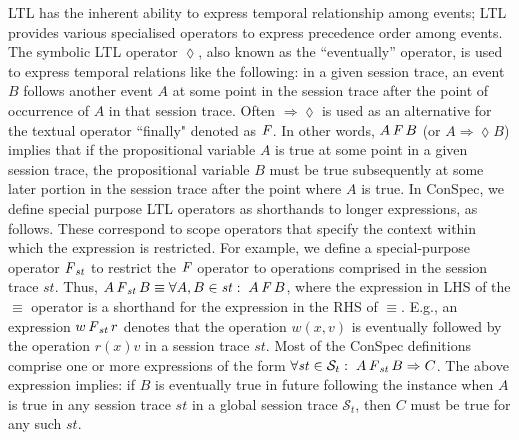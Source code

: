 \documentclass[journal,compsoc]{IEEEtran}
\begin{document}
 LTL has the inherent ability to express temporal relationship among events; LTL provides various specialised operators to express precedence order among events. The symbolic LTL operator  $\lozenge$, also known as the ``eventually''  operator, is used to express temporal relations like the following: in a given session trace, an event $B$ follows another event $A$ at some point in the session trace after the point of occurrence of $A$ in that session trace. Often  $\Rightarrow \lozenge$ is used as an alternative for the textual  operator ``finally" denoted as $\operatorname{\it F}$.
   In other words, $A \operatorname{\it F} B$ (or $A \Rightarrow \lozenge B$) implies that if the propositional variable $A$ is true at some point in a given session trace, the propositional variable $B$ must be true subsequently at some later portion in the session trace after the point where $A$ is true. %
  In ConSpec, we define special purpose LTL operators as shorthands to longer expressions, as follows. These correspond to scope operators
   that specify the context within which the expression is 
  restricted.  For example, we define a special-purpose operator $\operatorname{\it F}_\mathit{st}$ to restrict the $\operatorname{\it F}$ operator to operations comprised in the session trace $\mathit{st}$. Thus, $A \operatorname{\it F}_\mathit{st} B \equiv \forall A, B \in \mathit{st}:\; A \operatorname{\it F} B$, where the expression in LHS of the $\equiv$ operator is a shorthand for the expression in the RHS of $\equiv$. %
  E.g., an expression ${w} \operatorname{\it F}_\mathit{st} {r}$ denotes that the operation $w(x,v)$ is eventually followed by the operation  $r(x){v}$ in a session trace $\mathit{st}$.  Most of the ConSpec definitions comprise one or more expressions of the form $\forall \mathit{st} \in \mathcal{S}_t:\; A  \operatorname{\it F}_\mathit{st} B \Rightarrow  C$. The above expression implies: if $B$ is eventually true in future following the instance when $A$ is true  in any session trace $\mathit{st}$ in a global session trace $\mathcal{S}_t$, then $C$ must be true for any such $\mathit{st}$. 
\end{document}
